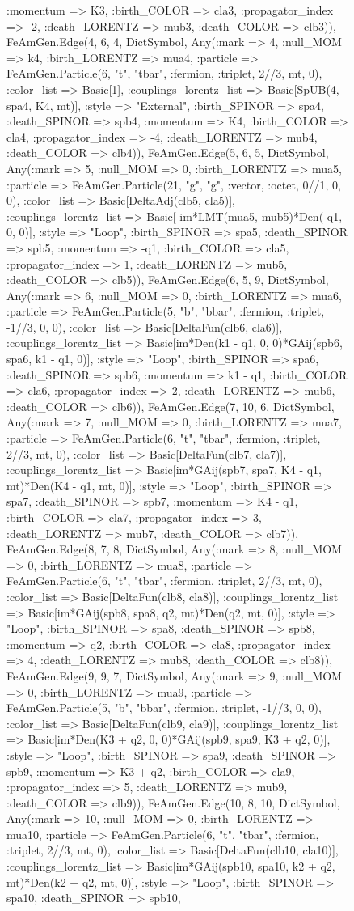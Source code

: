 \documentclass{revtex4}
\begin{document}
\begin{figure}[!htb]
\begin{center}
{:momentum => K3, :birth_COLOR => cla3, :propagator_index => -2, :death_LORENTZ => mub3, :death_COLOR => clb3)), FeAmGen.Edge(4, 6, 4, Dict{Symbol, Any}(:mark => 4, :null_MOM => k4, :birth_LORENTZ => mua4, :particle => FeAmGen.Particle(6, "t", "tbar", :fermion, :triplet, 2//3, mt, 0), :color_list => Basic[1], :couplings_lorentz_list => Basic[SpUB(4, spa4, K4, mt)], :style => "External", :birth_SPINOR => spa4, :death_SPINOR => spb4, :momentum => K4, :birth_COLOR => cla4, :propagator_index => -4, :death_LORENTZ => mub4, :death_COLOR => clb4)), FeAmGen.Edge(5, 6, 5, Dict{Symbol, Any}(:mark => 5, :null_MOM => 0, :birth_LORENTZ => mua5, :particle => FeAmGen.Particle(21, "g", "g", :vector, :octet, 0//1, 0, 0), :color_list => Basic[DeltaAdj(clb5, cla5)], :couplings_lorentz_list => Basic[-im*LMT(mua5, mub5)*Den(-q1, 0, 0)], :style => "Loop", :birth_SPINOR => spa5, :death_SPINOR => spb5, :momentum => -q1, :birth_COLOR => cla5, :propagator_index => 1, :death_LORENTZ => mub5, :death_COLOR => clb5)), FeAmGen.Edge(6, 5, 9, Dict{Symbol, Any}(:mark => 6, :null_MOM => 0, :birth_LORENTZ => mua6, :particle => FeAmGen.Particle(5, "b", "bbar", :fermion, :triplet, -1//3, 0, 0), :color_list => Basic[DeltaFun(clb6, cla6)], :couplings_lorentz_list => Basic[im*Den(k1 - q1, 0, 0)*GAij(spb6, spa6, k1 - q1, 0)], :style => "Loop", :birth_SPINOR => spa6, :death_SPINOR => spb6, :momentum => k1 - q1, :birth_COLOR => cla6, :propagator_index => 2, :death_LORENTZ => mub6, :death_COLOR => clb6)), FeAmGen.Edge(7, 10, 6, Dict{Symbol, Any}(:mark => 7, :null_MOM => 0, :birth_LORENTZ => mua7, :particle => FeAmGen.Particle(6, "t", "tbar", :fermion, :triplet, 2//3, mt, 0), :color_list => Basic[DeltaFun(clb7, cla7)], :couplings_lorentz_list => Basic[im*GAij(spb7, spa7, K4 - q1, mt)*Den(K4 - q1, mt, 0)], :style => "Loop", :birth_SPINOR => spa7, :death_SPINOR => spb7, :momentum => K4 - q1, :birth_COLOR => cla7, :propagator_index => 3, :death_LORENTZ => mub7, :death_COLOR => clb7)), FeAmGen.Edge(8, 7, 8, Dict{Symbol, Any}(:mark => 8, :null_MOM => 0, :birth_LORENTZ => mua8, :particle => FeAmGen.Particle(6, "t", "tbar", :fermion, :triplet, 2//3, mt, 0), :color_list => Basic[DeltaFun(clb8, cla8)], :couplings_lorentz_list => Basic[im*GAij(spb8, spa8, q2, mt)*Den(q2, mt, 0)], :style => "Loop", :birth_SPINOR => spa8, :death_SPINOR => spb8, :momentum => q2, :birth_COLOR => cla8, :propagator_index => 4, :death_LORENTZ => mub8, :death_COLOR => clb8)), FeAmGen.Edge(9, 9, 7, Dict{Symbol, Any}(:mark => 9, :null_MOM => 0, :birth_LORENTZ => mua9, :particle => FeAmGen.Particle(5, "b", "bbar", :fermion, :triplet, -1//3, 0, 0), :color_list => Basic[DeltaFun(clb9, cla9)], :couplings_lorentz_list => Basic[im*Den(K3 + q2, 0, 0)*GAij(spb9, spa9, K3 + q2, 0)], :style => "Loop", :birth_SPINOR => spa9, :death_SPINOR => spb9, :momentum => K3 + q2, :birth_COLOR => cla9, :propagator_index => 5, :death_LORENTZ => mub9, :death_COLOR => clb9)), FeAmGen.Edge(10, 8, 10, Dict{Symbol, Any}(:mark => 10, :null_MOM => 0, :birth_LORENTZ => mua10, :particle => FeAmGen.Particle(6, "t", "tbar", :fermion, :triplet, 2//3, mt, 0), :color_list => Basic[DeltaFun(clb10, cla10)], :couplings_lorentz_list => Basic[im*GAij(spb10, spa10, k2 + q2, mt)*Den(k2 + q2, mt, 0)], :style => "Loop", :birth_SPINOR => spa10, :death_SPINOR => spb10, }
\end{center}
\end{figure}
\end{document}
